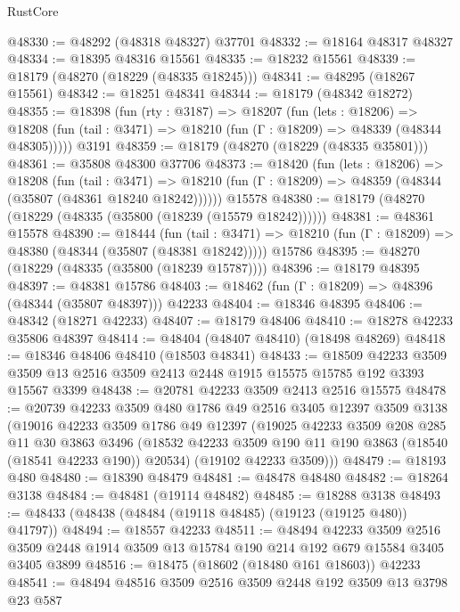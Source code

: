 \begin{lexlean}{RustCore}
\begin{coremodule}
@48330 := @48292 (@48318 @48327) @37701
@48332 := @18164 @48317 @48327
@48334 := @18395 @48316 @15561
@48335 := @18232 @15561
@48339 := @18179 (@48270 (@18229 (@48335 @18245)))
@48341 := @48295 (@18267 @15561)
@48342 := @18251 @48341
@48344 := @18179 (@48342 @18272)
@48355 := @18398
    (fun (rty : @3187) =>
    @18207
      (fun (lets : @18206) =>
      @18208 (fun (tail : @3471) => @18210 (fun (Γ : @18209) => @48339 (@48344 @48305)))))
    @3191
@48359 := @18179 (@48270 (@18229 (@48335 @35801)))
@48361 := @35808 @48300 @37706
@48373 := @18420
    (fun (lets : @18206) =>
    @18208
      (fun (tail : @3471) =>
      @18210 (fun (Γ : @18209) => @48359 (@48344 (@35807 (@48361 @18240 @18242))))))
    @15578
@48380 := @18179 (@48270 (@18229 (@48335 (@35800 (@18239 (@15579 @18242))))))
@48381 := @48361 @15578
@48390 := @18444
    (fun (tail : @3471) => @18210 (fun (Γ : @18209) => @48380 (@48344 (@35807 (@48381 @18242)))))
    @15786
@48395 := @48270 (@18229 (@48335 (@35800 (@18239 @15787))))
@48396 := @18179 @48395
@48397 := @48381 @15786
@48403 := @18462 (fun (Γ : @18209) => @48396 (@48344 (@35807 @48397))) @42233
@48404 := @18346 @48395
@48406 := @48342 (@18271 @42233)
@48407 := @18179 @48406
@48410 := @18278 @42233 @35806 @48397
@48414 := @48404 (@48407 @48410) (@18498 @48269)
@48418 := @18346 @48406 @48410 (@18503 @48341)
@48433 := @18509
    @42233
    @3509
    @3509
    @13
    @2516
    @3509
    @2413
    @2448
    @1915
    @15575
    @15785
    @192
    @3393
    @15567
    @3399
@48438 := @20781 @42233 @3509 @2413 @2516 @15575
@48478 := @20739
    @42233
    @3509
    @480
    @1786
    @49
    @2516
    @3405
    @12397
    @3509
    @3138
    (@19016
      @42233
      @3509
      @1786
      @49
      @12397
      (@19025
        @42233
        @3509
        @208
        @285
        @11
        @30
        @3863
        @3496
        (@18532 @42233 @3509 @190 @11 @190 @3863 (@18540 (@18541 @42233 @190)) @20534)
        (@19102 @42233 @3509)))
@48479 := @18193 @480
@48480 := @18390 @48479
@48481 := @48478 @48480
@48482 := @18264 @3138
@48484 := @48481 (@19114 @48482)
@48485 := @18288 @3138
@48493 := @48433 (@48438 (@48484 (@19118 @48485) (@19123 (@19125 @480)) @41797))
@48494 := @18557 @42233
@48511 := @48494
    @42233
    @3509
    @2516
    @3509
    @2448
    @1914
    @3509
    @13
    @15784
    @190
    @214
    @192
    @679
    @15584
    @3405
    @3405
    @3899
@48516 := @18475 (@18602 (@18480 @161 @18603)) @42233
@48541 := @48494
    @48516
    @3509
    @2516
    @3509
    @2448
    @192
    @3509
    @13
    @3798
    @23
    @587

\end{coremodule}
\end{lexlean}
